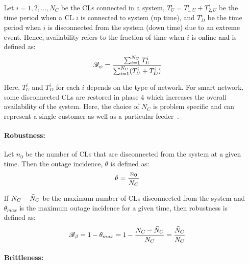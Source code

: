 Let $i = 1, 2, ... ,N_C$ be the CLs connected in a system, $T_U^i = T_{1,U}^i + T_{2,U}^i$ be the time period when a CL $i$ is connected to system (up time), and $T_D^i$ be the time period when $i$ is disconnected from the system (down time) due to an extreme event. Hence, availability refers to the fraction of time when $i$ is online and is defined as:
\vspace{-3pt}
\begin{equation} \small
    \mathcal{R}_\psi = \frac{\sum_{i=1}^{N_C} T_U^i}{\sum_{i=1}^{N_C} (T_U^i + T_D^i)}
    \label{eq:availability}
\end{equation}

\noindent
Here, $T_U^i$ and $T_D^i$ for each $i$ depends on the type of network. For smart network, some disconnected CLs are restored in phase 4 which increases the overall availability of the system. Here, the choice of $N_C$ is problem specific and can represent a single customer as well as a particular feeder~\cite{2016}.   

\paragraph*{Robustness:}

Let $n_0$ be the number of CLs that are disconnected from the system at a given time. Then the outage incidence, $\theta$ is defined as:
\vspace{-5pt}
\begin{equation} \small
    \theta = \frac{n_0}{N_C}
    \label{eq:max_incidence}
\end{equation}

\noindent
If $N_C - \Bar{N}_C$ be the maximum number of CLs disconnected from the system and $\theta_{max}$ is the maximum outage incidence for a given time, then robustness is defined as:
\vspace{-3pt}
\begin{equation} \small
    \mathcal{R}_\beta = 1 - \theta_{max} = 1 - \frac{N_C - \Bar{N}_C}{N_C} = \frac{\Bar{N}_C}{N_C}
    \label{eq:robustness}
\end{equation}


\paragraph*{Brittleness:}

